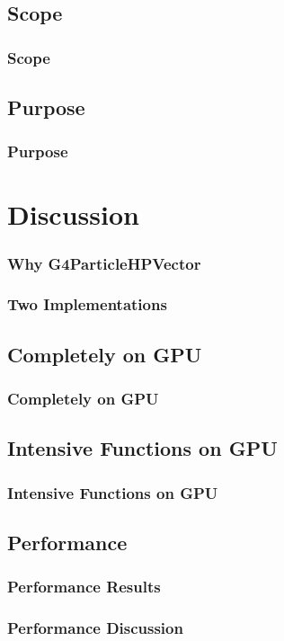 \documentclass{beamer}
\begin{document}
\subsection{Scope}
\begin{frame}
\frametitle{Scope}
\end{frame}

\subsection{Purpose}
\begin{frame}
\frametitle{Purpose}
\end{frame}

\section{Discussion}

\begin{frame}
\frametitle{Why G4ParticleHPVector}
\end{frame}

\begin{frame}
\frametitle{Two Implementations}
\end{frame}

\subsection{Completely on GPU}
\begin{frame}
\frametitle{Completely on GPU}
\end{frame}

\subsection{Intensive Functions on GPU}
\begin{frame}
\frametitle{Intensive Functions on GPU}
\end{frame}

\subsection{Performance}
\begin{frame}
\frametitle{Performance Results}
\end{frame}

\begin{frame}
\frametitle{Performance Discussion}
\end{frame}
\end{document}
